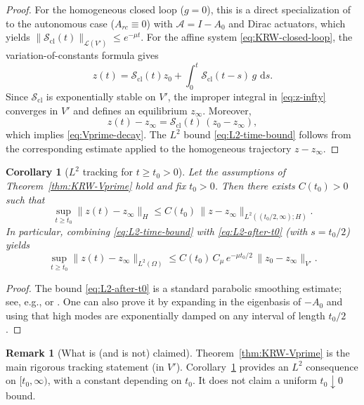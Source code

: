 \documentclass[11pt,a4paper]{article}
\numberwithin{equation}{section}
\newtheorem{corollary}[theorem]{Corollary}
\theoremstyle{definition}
\newtheorem{remark}[theorem]{Remark}
\newcommand{\1}{\mathbbm{1}}
\newcommand{\dd}{\,\mathrm{d}}
\begin{document}
\begin{proof}
For the homogeneous closed loop ($g=0$), this is a direct specialization of
\cite[Theorem~3.1]{KunRodWal24-cocv} to the autonomous case
($A_{rc}\equiv 0$) with $\mathcal A=I-A_0$ and Dirac actuators, which yields
$\|\mathcal{S}_{\mathrm{cl}}(t)\|_{\mathcal{L}(V')}\le e^{-\mu t}$.
\noindent
For the affine system \eqref{eq:KRW-closed-loop}, the variation-of-constants formula gives
\[
z(t)=\mathcal{S}_{\mathrm{cl}}(t)z_0+\int_0^t \mathcal{S}_{\mathrm{cl}}(t-s)\,g\,\dd s.
\]
Since $\mathcal{S}_{\mathrm{cl}}$ is exponentially stable on $V'$, the improper integral in
\eqref{eq:z-infty} converges in $V'$ and defines an equilibrium $z_\infty$.
Moreover,
\[
z(t)-z_\infty=\mathcal{S}_{\mathrm{cl}}(t)\,(z_0-z_\infty),
\]
which implies \eqref{eq:Vprime-decay}. The $L^2$ bound \eqref{eq:L2-time-bound} follows from the
corresponding estimate applied to the homogeneous
trajectory $z-z_\infty$.
\end{proof}

\begin{corollary}[$L^2$ tracking for $t\ge t_0>0$]
\label{cor:L2-after-t0}
Let the assumptions of Theorem~\ref{thm:KRW-Vprime} hold and fix $t_0>0$.
Then there exists $C(t_0)>0$ such that
\begin{equation}
\label{eq:L2-after-t0}
\sup_{t\ge t_0}\|z(t)-z_\infty\|_{H}
\le C(t_0)\,\|z-z_\infty\|_{L^2((t_0/2,\infty);H)}.
\end{equation}
In particular, combining \eqref{eq:L2-time-bound} with \eqref{eq:L2-after-t0} (with $s=t_0/2$) yields
\[
\sup_{t\ge t_0}\|z(t)-z_\infty\|_{L^2(\Omega)}
\le C(t_0)\,C_\mu\, e^{-\mu t_0/2}\,\|z_0-z_\infty\|_{V'}.
\]
\end{corollary}

\begin{proof}
The bound \eqref{eq:L2-after-t0} is a standard parabolic smoothing estimate; see, e.g., \cite[Ch.~4]{Pazy1983} or
\cite[Ch.~2]{Lunardi-Book}. One can also prove it by expanding in the eigenbasis of $-A_0$ and using that high modes
are exponentially damped on any interval of length $t_0/2$.
\end{proof}

\begin{remark}[What is (and is not) claimed]
\label{rem:KRW-what-claimed}
Theorem~\ref{thm:KRW-Vprime} is the main rigorous tracking statement (in $V'$).
Corollary~\ref{cor:L2-after-t0} provides an $L^2$ consequence on $[t_0,\infty)$, with a constant
depending on $t_0$. It does not claim a uniform $t_0\downarrow 0$ bound.
\end{remark}
\end{document}
